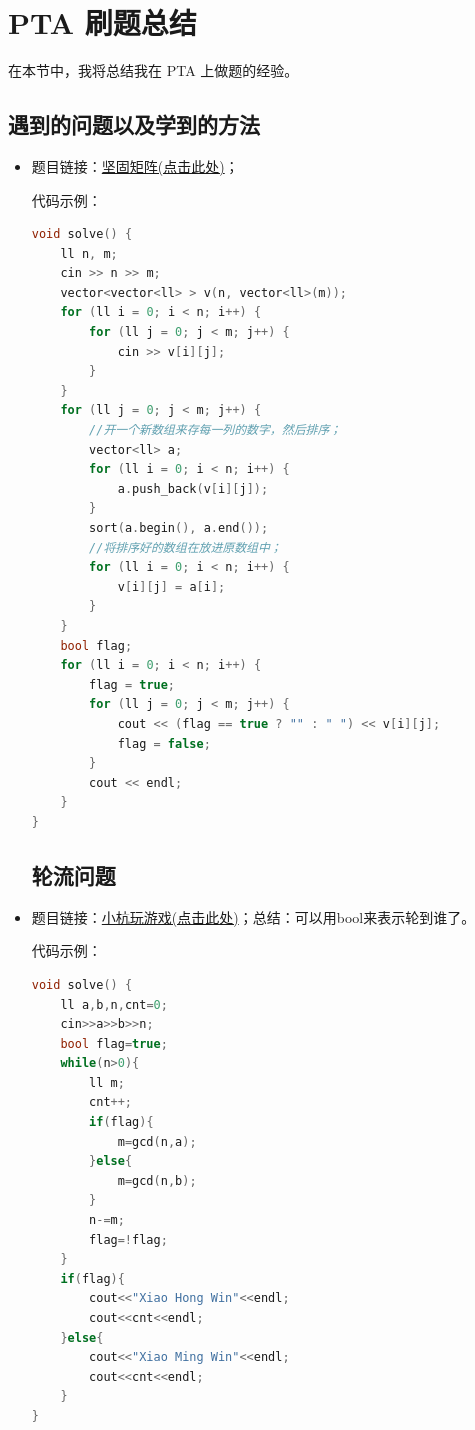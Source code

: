 \section{PTA 刷题总结}
在本节中，我将总结我在 PTA 上做题的经验。

\subsection{遇到的问题以及学到的方法}
\begin{itemize}
\subsection{对数组每一列按升序排序}
\item 题目链接：\href{https://pintia.cn/problem-sets/1997490617200599040/exam/problems/type/7?problemSetProblemId=1997490617559937029}{坚固矩阵(点击此处)}；						

代码示例：\\
\begin{lstlisting}[language=C++]
void solve() {
	ll n, m;
	cin >> n >> m;
	vector<vector<ll> > v(n, vector<ll>(m));
	for (ll i = 0; i < n; i++) {
		for (ll j = 0; j < m; j++) {
			cin >> v[i][j];
		}
	}
	for (ll j = 0; j < m; j++) {
		//开一个新数组来存每一列的数字，然后排序；
		vector<ll> a;
		for (ll i = 0; i < n; i++) {
			a.push_back(v[i][j]);
		}
		sort(a.begin(), a.end());
		//将排序好的数组在放进原数组中；
		for (ll i = 0; i < n; i++) {
			v[i][j] = a[i];
		}
	}
	bool flag;
	for (ll i = 0; i < n; i++) {
		flag = true;
		for (ll j = 0; j < m; j++) {
			cout << (flag == true ? "" : " ") << v[i][j];
			flag = false;
		}
		cout << endl;
	}
}
\end{lstlisting}
\subsection{轮流问题}
\item 题目链接：\href{https://pintia.cn/problem-sets/1997490617200599040/exam/problems/type/7?problemSetProblemId=1997490617559937026}{小杭玩游戏(点击此处)}；总结：可以用bool来表示轮到谁了。

代码示例：\\
\begin{lstlisting}[language=C++]
void solve() {
	ll a,b,n,cnt=0;
	cin>>a>>b>>n;
	bool flag=true;
	while(n>0){
		ll m;
		cnt++;
		if(flag){
			m=gcd(n,a);
		}else{
			m=gcd(n,b);
		}
		n-=m;
		flag=!flag;
	}
	if(flag){
		cout<<"Xiao Hong Win"<<endl;
		cout<<cnt<<endl;
	}else{
		cout<<"Xiao Ming Win"<<endl;
		cout<<cnt<<endl;
	}
}
\end{lstlisting}

\end{itemize}

